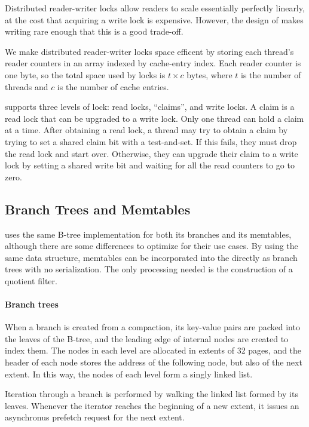 Distributed reader-writer locks allow readers to scale essentially
perfectly linearly, at the cost that acquiring a write lock is
expensive.  However, the design of \sysname makes writing rare enough
that this is a good trade-off.

We make distributed reader-writer locks space efficent by storing each
thread's reader counters in an array indexed by cache-entry index.
Each reader counter is one byte, so the total space used by locks
is $t\times c$ bytes, where $t$ is the number of threads and $c$ is the
number of cache entries.

\sysname supports three levels of lock: read locks, ``claims'', and
write locks.  A claim is a read lock that can be upgraded to a write
lock.  Only one thread can hold a claim at a time.  After obtaining a
read lock, a thread may try to obtain a claim by trying to set a
shared claim bit with a test-and-set. If this fails, they must drop
the read lock and start over.  Otherwise, they can upgrade their claim
to a write lock by setting a shared write bit and waiting for all the
read counters to go to zero.

\subsection{Branch Trees and Memtables}
\sysname uses the same B-tree implementation for both its branches and its
memtables, although there are some differences to optimize for their use cases.
By using the same data structure, memtables can be incorporated into the 
\datastruct directly as branch trees with no serialization. The only processing
needed is the construction of a quotient filter.

\paragraph{Branch trees}
When a branch is created from a compaction, its key-value pairs are packed into
the leaves of the B-tree, and the leading edge of internal nodes are created to
index them. The nodes in each level are allocated in extents of 32 pages, and
the header of each node stores the address of the following node, but also of
the next extent. In this way, the nodes of each level form a singly linked list.

Iteration through a branch is performed by walking the linked list
formed by its leaves.  Whenever the iterator reaches the beginning of
a new extent, it issues an asynchronus prefetch request for the next
extent.

